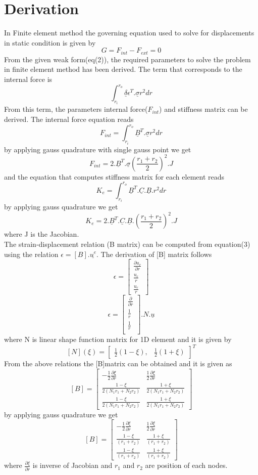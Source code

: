 \documentclass[a4paper,12pt]{article}
\begin{document}
\section*{Derivation}
In Finite element method the governing equation used to solve for displacements in static condition is given by 
$$  
G=F_{int} - F_{ext} = 0
$$
From the given weak form(eq(2)), the required parameters to solve the problem in finite element method has been derived. The term that corresponds to the internal force is $$ \int_{r_i}^{r_o} \underline{\delta}\epsilon^T .\underline{\sigma}  r^2 dr$$
 From this term, the parameters internal force($F_{int}$) and stiffness matrix can be derived. The internal force equation reads
 $$F_{int}= \int_{r_i}^{r_o} \underline{B}^T . \underline{\sigma} r^2 dr$$ by applying gauss quadrature with single gauss point we get 
$$  
F_{int} = 2.\underline{B}^T.\underline{\sigma}(\frac{r_1+r_2}{2})^2.J
$$
and the equation that computes stiffness matrix for each element reads $$K_e = \int_{r_i}^{r_o} \underline{B}^T.\underline{C}.\underline{B}.r^2 dr $$ by applying gauss quadrature we get 
$$  
K_e = 2.\underline{B}^T.\underline{C}.\underline{B}.(\frac{r_1+r_2}{2})^2.J
$$
where J is the Jacobian.\\
The strain-displacement relation (B matrix) can be computed from equation(3) using the relation $ \epsilon = [B].\underline{u^e} $. The derivation of [B] matrix follows
$$  
\epsilon = \begin{bmatrix}
\frac{\partial u_r }{\partial r}\\
\frac{u_r}{r}\\
\frac{u_r}{r}
\end{bmatrix}
$$
$$  
\epsilon = \begin{bmatrix}
\frac{\partial }{\partial r}\\
\frac{1}{r}\\
\frac{1}{r}\\
\end{bmatrix}. N .\underline{u}
$$
where N is linear shape function matrix for 1D element and it is given by $$ [N](\xi) = \begin{bmatrix}
\frac{1}{2}(1-\xi),& \frac{1}{2}(1+\xi)
\end{bmatrix}^T $$
From the above relations the [B]matrix can be obtained and it is given as 
$$  
[B] = \begin{bmatrix}
-\frac{1}{2}\frac{\partial \xi}{\partial r}&\frac{1}{2}\frac{\partial \xi}{\partial r}\\

\frac{1-\xi}{2(N_1r_1+N_2r_2)}&\frac{1+\xi}{2(N_1r_1+N_2r_2)}\\
\frac{1-\xi}{2(N_1r_1+N_2r_2)}&\frac{1+\xi}{2(N_1r_1+N_2r_2)}
\end{bmatrix}
$$
by applying gauss quadrature we get
$$  
[B] = \begin{bmatrix}
-\frac{1}{2}\frac{\partial \xi}{\partial r}&\frac{1}{2}\frac{\partial \xi}{\partial r}\\
\frac{1-\xi}{(r_1+r_2)}&\frac{1+\xi}{(r_1+r_2)}\\
\frac{1-\xi}{(r_1+r_2)}&\frac{1+\xi}{(r_1+r_2)}
\end{bmatrix}
$$
where $\frac{\partial \xi}{\partial r}$ is inverse of Jacobian and $r_1$  and $r_2$ are position of each nodes.
\newpage
\end{document}
